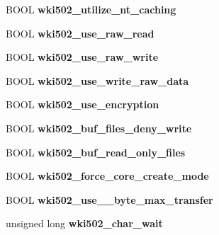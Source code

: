\begin{DoxyCompactItemize}
B\+O\+OL {\bfseries wki502\+\_\+utilize\+\_\+nt\+\_\+caching}
\item 
\mbox{\label{struct___w_k_s_t_a___i_n_f_o__502_aca647f563399be59c309624e0a23b083}} 
B\+O\+OL {\bfseries wki502\+\_\+use\+\_\+raw\+\_\+read}
\item 
\mbox{\label{struct___w_k_s_t_a___i_n_f_o__502_a2b425307fcb768c884e5bda992854286}} 
B\+O\+OL {\bfseries wki502\+\_\+use\+\_\+raw\+\_\+write}
\item 
\mbox{\label{struct___w_k_s_t_a___i_n_f_o__502_ad1f883bbc4a9a89c87fe1157762a54c2}} 
B\+O\+OL {\bfseries wki502\+\_\+use\+\_\+write\+\_\+raw\+\_\+data}
\item 
\mbox{\label{struct___w_k_s_t_a___i_n_f_o__502_a640f68fefeef01af61c600edc627d935}} 
B\+O\+OL {\bfseries wki502\+\_\+use\+\_\+encryption}
\item 
\mbox{\label{struct___w_k_s_t_a___i_n_f_o__502_ad63d88b80c6bf9401bb477299c7afd9c}} 
B\+O\+OL {\bfseries wki502\+\_\+buf\+\_\+files\+\_\+deny\+\_\+write}
\item 
\mbox{\label{struct___w_k_s_t_a___i_n_f_o__502_a7b4300c1bbd30f4510cf0fb6a5b4dbce}} 
B\+O\+OL {\bfseries wki502\+\_\+buf\+\_\+read\+\_\+only\+\_\+files}
\item 
\mbox{\label{struct___w_k_s_t_a___i_n_f_o__502_a49c9141e923c0ba5ee411ae3082b1023}} 
B\+O\+OL {\bfseries wki502\+\_\+force\+\_\+core\+\_\+create\+\_\+mode}
\item 
\mbox{\label{struct___w_k_s_t_a___i_n_f_o__502_aa6ab9f5b6a9d6761bf3c053a74d25b9f}} 
B\+O\+OL {\bfseries wki502\+\_\+use\+\_\+\_\+byte\+\_\+max\+\_\+transfer}
\item 
\mbox{\label{struct___w_k_s_t_a___i_n_f_o__502_aee2dfecd44a12e095ffd7400a97fe5a1}} 
unsigned long {\bfseries wki502\+\_\+char\+\_\+wait}
\item 
\mbox{\label{struct___w_k_s_t_a___i_n_f_o__502_a78c79b4dab4920c7841cf8b8917061a4}} 

\end{DoxyCompactItemize}
